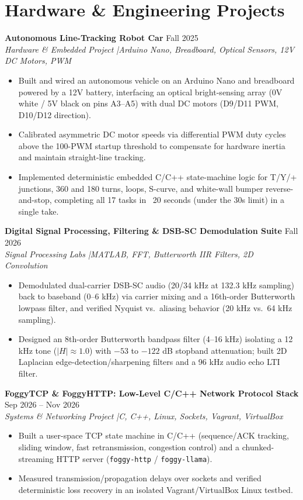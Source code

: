 \documentclass[10pt,a4paper]{article}
\begin{document}
\section{Hardware \& Engineering Projects}
\textbf{Autonomous Line-Tracking Robot Car} \hfill Fall 2025\\
\textit{Hardware \& Embedded Project \enspace|\enspace Arduino Nano, Breadboard, Optical Sensors, 12V DC Motors, PWM}
\begin{itemize}
  \item Built and wired an autonomous vehicle on an Arduino Nano and breadboard powered by a 12V battery, interfacing an optical bright-sensing array (0V white / 5V black on pins A3--A5) with dual DC motors (D9/D11 PWM, D10/D12 direction).
  \item Calibrated asymmetric DC motor speeds via differential PWM duty cycles above the 100-PWM startup threshold to compensate for hardware inertia and maintain straight-line tracking.
  \item Implemented deterministic embedded C/C++ state-machine logic for T/Y/+ junctions, 360\textdegree{} and 180\textdegree{} turns, loops, S-curve, and white-wall bumper reverse-and-stop, completing all 17 tasks in ~20 seconds (under the 30s limit) in a single take.
\end{itemize}
\vspace{3pt}

\textbf{Digital Signal Processing, Filtering \& DSB-SC Demodulation Suite} \hfill Fall 2026\\
\textit{Signal Processing Labs \enspace|\enspace MATLAB, FFT, Butterworth IIR Filters, 2D Convolution}
\begin{itemize}
  \item Demodulated dual-carrier DSB-SC audio (20/34 kHz at 132.3 kHz sampling) back to baseband (0--6 kHz) via carrier mixing and a 16th-order Butterworth lowpass filter, and verified Nyquist vs.\ aliasing behavior (20 kHz vs.\ 64 kHz sampling).
  \item Designed an 8th-order Butterworth bandpass filter (4--16 kHz) isolating a 12 kHz tone ($|H|\approx 1.0$) with $-53$ to $-122$ dB stopband attenuation; built 2D Laplacian edge-detection/sharpening filters and a 96 kHz audio echo LTI filter.
\end{itemize}
\vspace{3pt}

\textbf{FoggyTCP \& FoggyHTTP: Low-Level C/C++ Network Protocol Stack} \hfill Sep 2026 -- Nov 2026\\
\textit{Systems \& Networking Project \enspace|\enspace C, C++, Linux, Sockets, Vagrant, VirtualBox}
\begin{itemize}
  \item Built a user-space TCP state machine in C/C++ (sequence/ACK tracking, sliding window, fast retransmission, congestion control) and a chunked-streaming HTTP server (\texttt{foggy-http} / \texttt{foggy-llama}).
  \item Measured transmission/propagation delays over sockets and verified deterministic loss recovery in an isolated Vagrant/VirtualBox Linux testbed.
\end{itemize}
\end{document}
